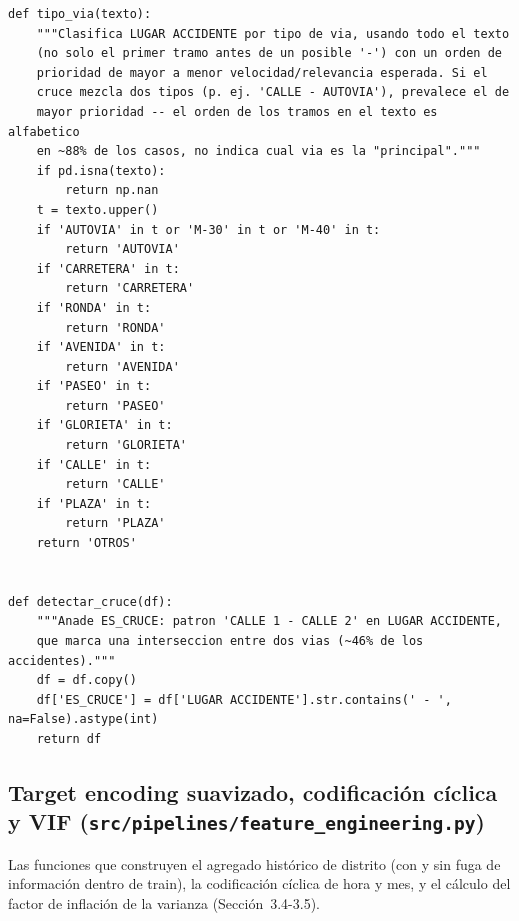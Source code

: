\documentclass[11pt,a4paper]{article}
\begin{document}
\begin{lstlisting}[caption={Agregación de persona a accidente, verificación de invariancia y clasificación del tipo de vía por texto.}]
def tipo_via(texto):
    """Clasifica LUGAR ACCIDENTE por tipo de via, usando todo el texto
    (no solo el primer tramo antes de un posible '-') con un orden de
    prioridad de mayor a menor velocidad/relevancia esperada. Si el
    cruce mezcla dos tipos (p. ej. 'CALLE - AUTOVIA'), prevalece el de
    mayor prioridad -- el orden de los tramos en el texto es alfabetico
    en ~88% de los casos, no indica cual via es la "principal"."""
    if pd.isna(texto):
        return np.nan
    t = texto.upper()
    if 'AUTOVIA' in t or 'M-30' in t or 'M-40' in t:
        return 'AUTOVIA'
    if 'CARRETERA' in t:
        return 'CARRETERA'
    if 'RONDA' in t:
        return 'RONDA'
    if 'AVENIDA' in t:
        return 'AVENIDA'
    if 'PASEO' in t:
        return 'PASEO'
    if 'GLORIETA' in t:
        return 'GLORIETA'
    if 'CALLE' in t:
        return 'CALLE'
    if 'PLAZA' in t:
        return 'PLAZA'
    return 'OTROS'


def detectar_cruce(df):
    """Anade ES_CRUCE: patron 'CALLE 1 - CALLE 2' en LUGAR ACCIDENTE,
    que marca una interseccion entre dos vias (~46% de los accidentes)."""
    df = df.copy()
    df['ES_CRUCE'] = df['LUGAR ACCIDENTE'].str.contains(' - ', na=False).astype(int)
    return df
\end{lstlisting}

\subsection{Target encoding suavizado, codificación cíclica y VIF (\texttt{src/pipelines/feature\_engineering.py})}
\label{app:encoding}

Las funciones que construyen el agregado histórico de distrito (con y sin fuga de información dentro de train), la codificación cíclica de hora y mes, y el cálculo del factor de inflación de la varianza (Sección~3.4-3.5).
\end{document}
